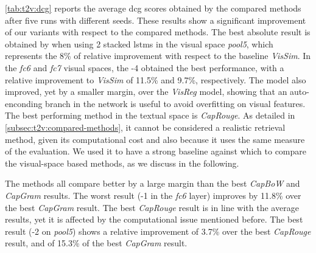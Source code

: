 \ref{tab:t2v:dcg} reports the average \gls{dcg} scores obtained by the compared methods after five runs with different seeds. %
These results show a significant improvement of our \ttv{} variants with respect to the compared methods.
The best absolute result is obtained by \widedeepttv{} when using 2 stacked \glspl{lstm} in the visual space \emph{pool5}, which represents the 8\% of relative improvement with respect to the baseline \emph{VisSim}.
In the \emph{fc6} and \emph{fc7} visual spaces, the \widedeepttv{}-4 obtained the best performance, with a relative improvement to \emph{VisSim} of 11.5\% and 9.7\%, respectively.
The \sparsettv{} model also improved, yet by a smaller margin, over the \emph{VisReg} model, showing that an auto-enconding branch in the network is useful to avoid overfitting on visual features.
The best performing method in the textual space is \emph{CapRouge}.
As detailed in \ref{subsec:t2v:compared-methods}, it cannot be considered a realistic retrieval method, given its computational cost and also because it uses the same measure of the evaluation.
We used it to have a strong baseline against which to compare the visual-space based methods, as we discuss in the following.

The \ttv{} methods all compare better by a large margin than the best \emph{CapBoW} and \emph{CapGram} results.
The worst \ttv{} result (\densettv{}-1 in the \emph{fc6} layer) improves by 11.8\% over the best \emph{CapGram} result.
The best \emph{CapRouge} result is in line with the average \ttv{} results, yet it is affected by the computational issue mentioned before.
The best \ttv{} result (\widedeepttv{}-2 on \emph{pool5}) shows a relative improvement of 3.7\% over the best \emph{CapRouge} result, and of 15.3\% of the best \emph{CapGram} result.

